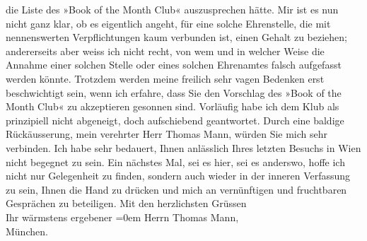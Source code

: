 \begin{ledgroupsized}[t]{13cm}
               die Liste des »Book of the Month Club« auszusprechen
               hätte. Mir ist es nun nicht ganz klar, ob es eigentlich angeht, für eine solche
               Ehrenstelle, die mit nennenswerten Verpflichtungen kaum verbunden ist, einen Gehalt
               zu beziehen; andererseits aber weiss ich nicht recht, von wem und in welcher Weise
               die Annahme einer solchen Stelle oder eines solchen Ehrenamtes falsch aufgefasst
               werden könnte. Trotzdem werden meine freilich sehr vagen Bedenken erst beschwichtigt
               sein, wenn ich erfahre, dass Sie den Vorschlag des »Book
                  of the Month Club« zu akzeptieren gesonnen sind. Vorläufig habe ich dem Klub
               als prinzipiell nicht abgeneigt, doch aufschiebend geantwortet. Durch eine baldige
               Rückäusserung, mein verehrter Herr Thomas Mann, würden Sie mich sehr verbinden.\pend
           \pstart
           Ich habe sehr bedauert\introOben{},\introOben{} Ihnen anlässlich Ihres letzten
               Besuchs in Wien nicht begegnet zu sein. Ein nächstes
               Mal, sei es hier, sei es anderswo, hoffe ich nicht nur Gelegenheit zu finden, sondern auch  wieder in der inneren Verfassung zu sein\introOben{},\introOben{}
               Ihnen die Hand zu drücken und mich an vernünftigen und fruchtbaren Gesprächen zu
               beteiligen.\pend
           \pstart
           Mit den herzlichsten Grüssen{\\[\baselineskip]}Ihr wärmstens ergebener\pend
           \leftskip=0em{}{\bigskip}\pstart
           \noindent{}Herrn Thomas Mann,{\\}München.\pend
           \endnumbering{}\end{ledgroupsized}  \newcommand{\dateiname}{L02507}\newcommand{\titel}{Arthur Schnitzler an Thomas Mann, 30. 1. 1929}\newcommand{\editorInnen}{Martin Anton Müller und Gerd-Hermann Susen}
      